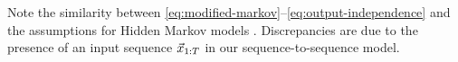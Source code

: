 Note the similarity between \cref{eq:modified-markov}--\cref{eq:output-independence}
and the assumptions for Hidden Markov models \citep{ramage2007hidden}. Discrepancies are due
to the presence of an input sequence $\vec{x}_{1:T}$ in our sequence-to-sequence model.



